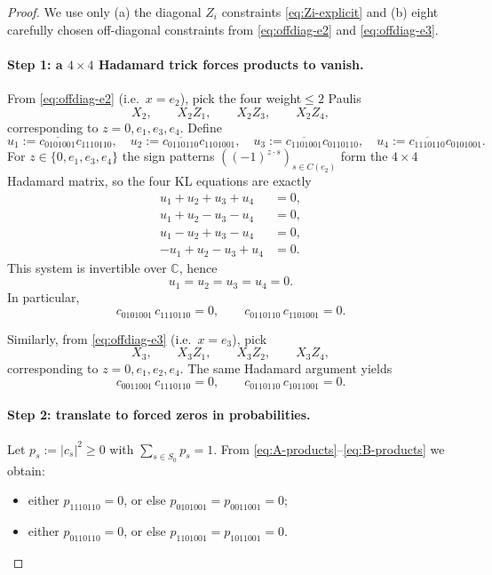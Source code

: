 \documentclass[11pt]{article}
\begin{document}
\begin{proof}
We use only (a) the diagonal $Z_i$ constraints \eqref{eq:Zi-explicit} and (b) eight carefully chosen off-diagonal constraints from
\eqref{eq:offdiag-e2} and \eqref{eq:offdiag-e3}.

\paragraph{Step 1: a $4\times 4$ Hadamard trick forces products to vanish.}
From \eqref{eq:offdiag-e2} (i.e.\ $x=e_2$), pick the four weight$\le 2$ Paulis
\[
X_2,\qquad X_2Z_1,\qquad X_2Z_3,\qquad X_2Z_4,
\]
corresponding to $z=0,e_1,e_3,e_4$.
Define
\[
u_1:=\overline{c_{0101001}}c_{1110110},\quad
u_2:=\overline{c_{0110110}}c_{1101001},\quad
u_3:=\overline{c_{1101001}}c_{0110110},\quad
u_4:=\overline{c_{1110110}}c_{0101001}.
\]
For $z\in\{0,e_1,e_3,e_4\}$ the sign patterns $((-1)^{z\cdot s})_{s\in C(e_2)}$ form the $4\times 4$ Hadamard matrix,
so the four KL equations are exactly
\[
\begin{aligned}
u_1+u_2+u_3+u_4&=0,\\
u_1+u_2-u_3-u_4&=0,\\
u_1-u_2+u_3-u_4&=0,\\
-u_1+u_2-u_3+u_4&=0.
\end{aligned}
\]
This system is invertible over $\mathbb C$, hence
\[
u_1=u_2=u_3=u_4=0.
\]
In particular,
\begin{equation}
c_{0101001}\,c_{1110110}=0,\qquad
c_{0110110}\,c_{1101001}=0.
\tag{A}\label{eq:A-products}
\end{equation}

Similarly, from \eqref{eq:offdiag-e3} (i.e.\ $x=e_3$), pick
\[
X_3,\qquad X_3Z_1,\qquad X_3Z_2,\qquad X_3Z_4,
\]
corresponding to $z=0,e_1,e_2,e_4$. The same Hadamard argument yields
\begin{equation}
c_{0011001}\,c_{1110110}=0,\qquad
c_{0110110}\,c_{1011001}=0.
\tag{B}\label{eq:B-products}
\end{equation}

\paragraph{Step 2: translate to forced zeros in probabilities.}
Let $p_s:=|c_s|^2\ge 0$ with $\sum_{s\in S_0}p_s=1$.
From \eqref{eq:A-products}--\eqref{eq:B-products} we obtain:
\begin{itemize}
\item either $p_{1110110}=0$, or else $p_{0101001}=p_{0011001}=0$;
\item either $p_{0110110}=0$, or else $p_{1101001}=p_{1011001}=0$.
\end{itemize}


\end{proof}
\end{document}
